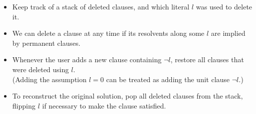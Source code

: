 \documentclass[a4paper, 11pt]{article}
\theoremstyle{definition}
\begin{document}
\begin{itemize}
  \item Keep track of a stack of deleted clauses, and which literal $l$ was used to delete it.
  \item We can delete a clause at any time if its resolvents along some $l$ are implied by permanent clauses.
  \item Whenever the user adds a new clause containing $\neg l$, restore all clauses that were deleted using $l$. \\
  (Adding the assumption $l=0$ can be treated as adding the unit clause $\neg l$.)
  \item To reconstruct the original solution, pop all deleted clauses from the stack, flipping $l$ if necessary to make the clause satisfied.
\end{itemize}

\nocite{*}


\end{document}
